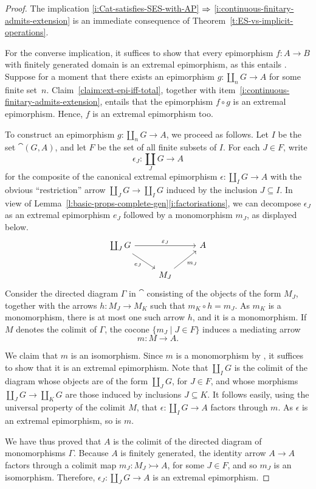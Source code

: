 \documentclass[a4paper,10pt,reqno]{amsart}
\theoremstyle{definition}
\theoremstyle{remark}
\begin{document}
\begin{proof}
The implication \ref{i:Cat-satisfies-SES-with-AP} $\Rightarrow$ \ref{i:continuous-finitary-admits-extension} is an immediate consequence of Theorem~\ref{t:ES-vs-implicit-operations}.

For the converse implication, it suffices to show that every epimorphism $f\colon A\to B$ with finitely generated domain is an extremal epimorphism, as this entails \WES.
%
Suppose for a moment that there exists an epimorphism $g\colon \coprod_{n}G \to A$ for some finite set~$n$. Claim~\ref{claim:ext-epi-iff-total}, together with item~\ref{i:continuous-finitary-admits-extension}, entails that the epimorphism $f\circ g$ is an extremal epimorphism. Hence, $f$ is an extremal epimorphism too. 

To construct an epimorphism $g\colon \coprod_{n}G \to A$, we proceed as follows. Let $I$ be the set $\cat(G, A)$, and let $F$ be the set of all finite subsets of $I$. For each $J\in F$, write
\[
\epsilon_{J}\colon \coprod_{J}G\to A
\]
for the composite of the canonical extremal epimorphism $\epsilon \colon \coprod_{I}G \to A$ with the obvious ``restriction'' arrow $\coprod_{J}G \to \coprod_{I}G$ induced by the inclusion $J\subseteq I$. In view of Lemma~\ref{l:basic-props-complete-gen}\ref{i:factorisations}, we can decompose $\epsilon_{J}$ as an extremal epimorphism $e_{J}$ followed by a monomorphism $m_{J}$, as displayed below.
\[\begin{tikzcd}
\coprod_{J}G \arrow{rr}{\epsilon_{J}} \arrow{dr}[swap]{e_{J}} & & A \\
& M_{J} \arrow{ur}[swap]{m_{J}} & 
\end{tikzcd}\]
%
Consider the directed diagram $\Gamma$ in $\cat$ consisting of the objects of the form $M_{J}$, together with the arrows $h\colon M_{J}\to M_{K}$ such that $m_{K}\circ h = m_{J}$. As $m_{K}$ is a monomorphism, there is at most one such arrow $h$, and it is a monomorphism. If~$M$ denotes the colimit of $\Gamma$, the cocone $\{m_{J}\mid J\in F\}$ induces a mediating arrow
\[
m\colon M \to A.
\]

We claim that $m$ is an isomorphism. Since $m$ is a monomorphism by \cite[Proposition~1.62]{ar94book}, it suffices to show that it is an extremal epimorphism. Note that $\coprod_{I}G$ is the colimit of the diagram whose objects are of the form $\coprod_{J}G$, for $J\in F$, and whose morphisms $\coprod_{J}G \to \coprod_{K}G$ are those induced by inclusions $J\subseteq K$. It follows easily, using the universal property of the colimit $M$, that $\epsilon\colon \coprod_{I}G \to A$ factors through $m$. As $\epsilon$ is an extremal epimorphism, so is $m$. 

We have thus proved that $A$ is the colimit of the directed diagram of monomorphisms $\Gamma$. Because $A$ is finitely generated, the identity arrow $A\to A$ factors through a colimit map $m_{J}\colon M_{J}\rightarrowtail A$, for some $J\in F$, and so $m_{J}$ is an isomorphism. Therefore, $\epsilon_{J}\colon \coprod_{J}G\to A$ is an extremal epimorphism.
\end{proof}
\end{document}
